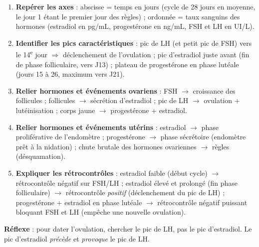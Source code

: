 \documentclass[11pt]{article}
\newcommand{\cle}[1]{{\popxbold\color{popdark}#1}}
\begin{document}
\begin{methode}
\begin{enumerate}
\item \textbf{Repérer les axes} : abscisse = temps en jours (cycle de 28 jours en moyenne, le jour 1 étant le premier jour des règles) ; ordonnée = taux sanguins des hormones (estradiol en pg/mL, progestérone en ng/mL, FSH et LH en UI/L).
\item \textbf{Identifier les pics caractéristiques} : pic de \cle{LH} (et petit pic de FSH) vers le 14\textsuperscript{e} jour $\Rightarrow$ déclenchement de l'\cle{ovulation} ; pic d'\cle{estradiol} juste avant (fin de phase folliculaire, vers J13) ; plateau de \cle{progestérone} en phase lutéale (jours 15 à 26, maximum vers J21).
\item \textbf{Relier hormones et événements ovariens} : FSH $\rightarrow$ croissance des follicules ; follicules $\rightarrow$ sécrétion d'estradiol ; pic de LH $\rightarrow$ ovulation + lutéinisation ; corps jaune $\rightarrow$ progestérone + estradiol.
\item \textbf{Relier hormones et événements utérins} : estradiol $\rightarrow$ phase proliférative de l'endomètre ; progestérone $\rightarrow$ phase sécrétoire (endomètre prêt à la nidation) ; chute brutale des hormones ovariennes $\rightarrow$ règles (désquamation).
\item \textbf{Expliquer les rétrocontrôles} : estradiol faible (début cycle) $\rightarrow$ rétrocontrôle négatif sur FSH/LH ; estradiol élevé et prolongé (fin phase folliculaire) $\rightarrow$ rétrocontrôle \emph{positif} (déclenchement du pic de LH) ; progestérone + estradiol en phase lutéale $\rightarrow$ rétrocontrôle négatif puissant bloquant FSH et LH (empêche une nouvelle ovulation).
\end{enumerate}
\textbf{Réflexe} : pour dater l'ovulation, chercher le pic de LH, pas le pic d'estradiol. Le pic d'estradiol \emph{précède} et \emph{provoque} le pic de LH.
\end{methode}
\end{document}
